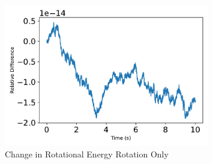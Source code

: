 \begin{figure}[htbp]\centerline{\includegraphics[width=0.8\textwidth]{AutoTeX/scPlusChangeInRotationalEnergyRotationOnly}}\caption{Change in Rotational Energy Rotation Only}\label{fig:scPlusChangeInRotationalEnergyRotationOnly}\end{figure}